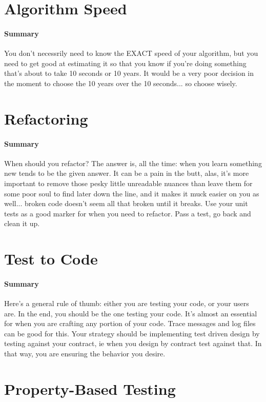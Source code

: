 \documentclass{article}
\begin{document}
\section{Algorithm Speed}
    \paragraph{Summary} You don't necessrily need to know the EXACT speed of your algorithm, but you need to get good at estimating it so that you know if you're doing something that's about to take 10 seconds or 10 years. It would be a very poor decision in the moment to choose the 10 years over the 10 seconds... so choose wisely.  

\section{Refactoring}
    \paragraph{Summary} When should you refactor? The answer is, all the time: when you learn something new tends to be the given answer. It can be a pain in the butt, alas, it's more important to remove those pesky little unreadable nuances than leave them for some poor soul to find later down the line, and it makes it muck easier on you as well... broken code doesn't seem all that broken until it breaks. Use your unit tests as a good marker for when you need to refactor. Pass a test, go back and clean it up.

\section{Test to Code}
    \paragraph{Summary} Here's a general rule of thumb: either you are testing your code, or your users are. In the end, you should be the one testing your code. It's almost an essential for when you are crafting any portion of your code. Trace messages and log files can be good for this. Your strategy should be implementing test driven design by testing against your contract, ie when you design by contract test against that. In that way, you are ensuring the behavior you desire.

\section{Property-Based Testing}
\end{document}
